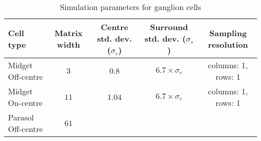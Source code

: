\begin{table}[hb]
  \caption{Simulation parameters for ganglion cells}
  \centering
  \begin{tabular}{l c c c c}
    \begin{minipage}{1.2cm}Cell type \end{minipage}& 
    \begin{minipage}{1cm} \centering Matrix width \end{minipage}&  
    \begin{minipage}{1.3cm}\centering Centre std. dev. ($\sigma_c$)\end{minipage} & 
    \begin{minipage}{1.3cm}\centering Surround std. dev. ($\sigma_s$)\end{minipage} & 
    \begin{minipage}{1.2cm}\centering Sampling resolution\end{minipage} \\
    \hline
    \begin{minipage}{1.2cm}\vspace*{0.1cm} Midget Off-centre \vspace*{0.005cm} \end{minipage}& 
    \begin{minipage}{1cm}\centering$3$ \end{minipage}& 
    $0.8$ & $6.7 \times \sigma_c$ &  
    \begin{minipage}{1.4cm}columns: 1, rows: 1\end{minipage}\\
    \begin{minipage}{1.2cm} Midget On-centre \vspace*{0.005cm}\end{minipage} & 
    \begin{minipage}{1cm}\centering $11$ \end{minipage}& 
    $1.04$ & $6.7 \times \sigma_c$ &  
    \begin{minipage}{1.4cm}columns: 1, rows: 1\end{minipage}\\
    \begin{minipage}{1.2cm}Parasol Off-centre \vspace*{0.005cm}\end{minipage} & 
    \begin{minipage}{1cm}\centering $61$ \end{minipage}& 

\end{tabular}
\end{table}
